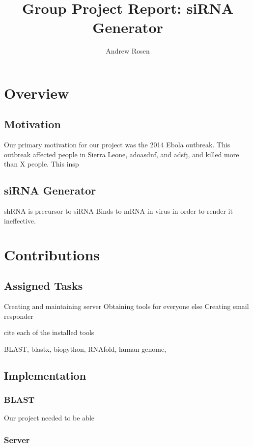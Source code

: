 \documentclass[10pt,letterpaper]{article}
\author{Andrew Rosen}
\title{Group Project Report: siRNA Generator}
\date{}
\begin{document}
\maketitle

\section{Overview}


\subsection{Motivation}
Our primary motivation for our project was the 2014 Ebola outbreak.
This outbreak affected people in Sierra Leone, adoasdnf, and adsfj, and killed more than X people.
This insp



\subsection{siRNA  Generator}
shRNA is precursor to siRNA
Binds to mRNA in virus in order to render it ineffective.

\section{Contributions}




\subsection{Assigned Tasks}

Creating and maintaining server
Obtaining tools for everyone else
Creating email responder

cite each of the installed tools

BLAST, blastx, biopython, RNAfold, human genome,

\subsection{Implementation}




\subsubsection{BLAST}

Our project needed to be able 


\subsubsection{Server}
\end{document}
